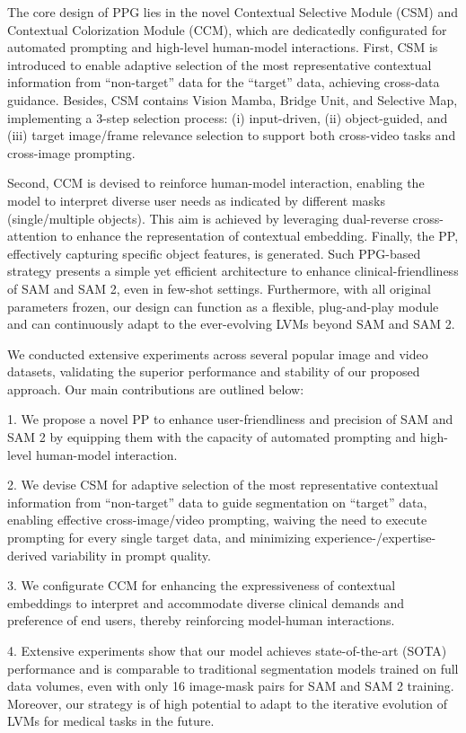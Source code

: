 The core design of PPG lies in the novel Contextual Selective Module (CSM) and Contextual Colorization Module (CCM), which are dedicatedly configurated for automated prompting and high-level human-model interactions. First, CSM is introduced to enable adaptive selection of the most representative contextual information from ``non-target'' data for the ``target'' data, achieving cross-data guidance. Besides, CSM contains Vision Mamba, Bridge Unit, and Selective Map, implementing a 3-step selection process: (i) input-driven, (ii) object-guided, and (iii) target image/frame relevance selection to support both cross-video tasks and cross-image prompting. 

Second, CCM is devised to reinforce human-model interaction, enabling the model to interpret diverse user needs as indicated by different masks (\eg single/multiple objects). This aim is achieved by leveraging dual-reverse cross-attention to enhance the representation of contextual embedding. Finally, the PP, effectively capturing specific object features, is generated.
Such PPG-based strategy presents a simple yet efficient architecture to enhance clinical-friendliness of SAM and SAM 2, even in few-shot settings. Furthermore, with all original parameters frozen, our design can function as a flexible, plug-and-play module and can continuously adapt to the ever-evolving LVMs beyond SAM and SAM 2.

We conducted extensive experiments across several popular image and video datasets, validating the superior performance and stability of our proposed approach. Our main contributions are outlined below:

1. We propose a novel PP to enhance user-friendliness and precision of SAM and SAM 2 by equipping them with the capacity of automated prompting and high-level human-model interaction.

2. We devise CSM for adaptive selection of the most representative contextual information from “non-target” data to guide segmentation on “target” data, enabling effective cross-image/video prompting, waiving the need to execute prompting for every single target data, and minimizing experience-/expertise-derived variability in prompt quality.

3. We configurate CCM for enhancing the expressiveness of contextual embeddings to interpret and accommodate diverse clinical demands and preference of end users, thereby reinforcing model-human interactions.

4. Extensive experiments show that our model achieves state-of-the-art (SOTA) performance and is comparable to traditional segmentation models trained on full data volumes, even with only 16 image-mask pairs for SAM and SAM 2 training. Moreover, our strategy is of high potential to adapt to the iterative evolution of LVMs for medical tasks in the future.
